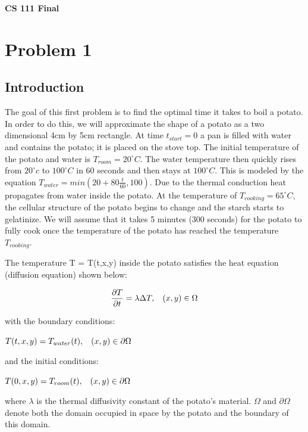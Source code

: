 \documentclass[12pt]{article}
\begin{document}
\centerline{\Large\textbf{CS 111 Final}}
\vspace{.5cm}

\section*{Problem 1}\label{sec::Problem1}
\subsection*{Introduction}
The goal of this first problem is to find the optimal time it takes to boil a potato. In order to do this, we will approximate the shape of a potato as a two dimensional 4cm by 5cm rectangle. At time $t_{start}=0$ a pan is filled with water and contains the potato; it is placed on the stove top. The initial temperature of the potato and water is $T_{room} = 20^\circ C$. The water temperature then quickly rises from $20^\circ c$ to $100^\circ C$ in 60 seconds and then stays at $100^\circ C$. This is modeled by the equation $T_{water} = min(20 + 80\frac{t}{60}, 100)$. Due to the thermal conduction heat propagates from water inside the potato. At the temperature of $T_{cooking} = 65^\circ C$, the cellular structure of the potato begins to change and the starch starts to gelatinize. We will assume that it takes 5 minutes (300 seconds) for the potato to fully cook once the temperature of the potato has reached the temperature $T_{cooking}$.

The temperature T = T(t,x,y) inside the potato satisfies the heat equation (diffusion equation) shown below:
\begin{center}
\begin{equation}
\frac{\partial T}{\partial t}= \lambda \Delta T ,\hspace{.3cm}(x,y) \in \Omega
\end{equation}
\end{center}
with the boundary conditions:
\begin{center}
$T(t,x,y) = T_{water}(t),\hspace{.3cm}(x,y) \in \partial \Omega$
\end{center}
and the initial conditions:
\begin{center}
$T(0,x,y) = T_{room}(t),\hspace{.3cm}(x,y) \in \partial \Omega$
\end{center}
where $\lambda$ is the thermal diffusivity constant of the potato's material. $\Omega$ and $\partial \Omega$ denote both the domain occupied in space by the potato and the boundary of this domain.
\newpage
\end{document}
